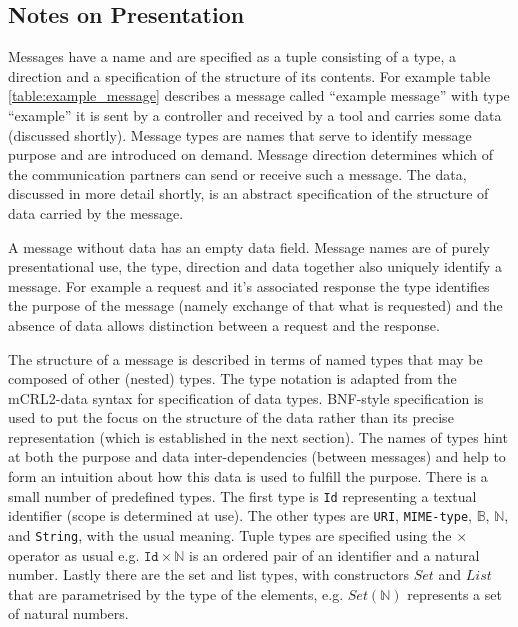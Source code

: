 \documentclass{article}
\begin{document}
  \subsection{Notes on Presentation}

   Messages have a name and are specified as a tuple consisting of a type, a
   direction and a specification of the structure of its contents. For example
   table \ref{table:example_message} describes a message called ``example
   message'' with type ``example'' it is sent by a controller and received by a
   tool and carries some data (discussed shortly). Message types are names that
   serve to identify message purpose and are introduced on demand.  Message
   direction determines which of the communication partners can send or receive
   such a message. The data, discussed in more detail shortly, is an abstract
   specification of the structure of data carried by the message.
   
   A message without data has an empty data field. Message names are of purely
   presentational use, the type, direction and data together also uniquely
   identify a message. For example a request and it's associated response the
   type identifies the purpose of the message (namely exchange of that what is
   requested) and the absence of data allows distinction between a request and
   the response.
   
   The structure of a message is described in terms of named types that may be
   composed of other (nested) types. The type notation is adapted from the
   mCRL2-data syntax for specification of data types. BNF-style specification
   is used to put the focus on the structure of the data rather than its
   precise representation (which is established in the next section).  The
   names of types hint at both the purpose and data inter-dependencies (between
   messages) and help to form an intuition about how this data is used to
   fulfill the purpose.  There is a small number of predefined types. The first
   type is \texttt{Id} representing a textual identifier (scope is determined
   at use).  The other types are \texttt{URI}, \texttt{MIME-type},
   $\mathbb{B}$, $\mathbb{N}$, and \texttt{String}, with the usual meaning.
   Tuple types are specified using the $\times$ operator as usual e.g.
   $\texttt{Id} \times \mathbb{N}$ is an ordered pair of an identifier and a
   natural number.  Lastly there are the set and list types, with constructors
   $Set$ and $List$ that are parametrised by the type of the elements, e.g.
   $Set(\mathbb{N})$ represents a set of natural numbers.
   
\end{document}
